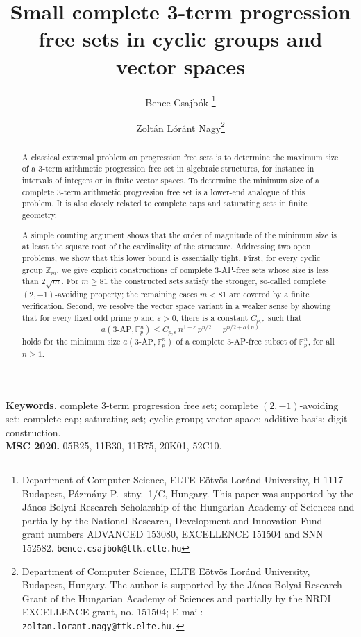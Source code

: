 \documentclass[11pt]{article}
\title{Small complete 3-term progression free sets in cyclic groups and vector spaces}
\author{Bence Csajb\'ok \thanks{Department of Computer Science, 
		ELTE E\"otv\"os Lor\'and University, 
		H-1117 Budapest, P\'azm\'any P.\ stny.\ 1/C, Hungary. This paper was supported by the János Bolyai Research Scholarship of the Hungarian Academy of Sciences and partially by the National Research, Development and Innovation Fund – grant numbers ADVANCED 153080, EXCELLENCE 151504 and SNN 152582. {\texttt{bence.csajbok@ttk.elte.hu}}} \and Zolt\'an Lóránt Nagy\thanks{ Department of Computer Science, 
		ELTE  E\"otv\"os Lor\'and University, Budapest, Hungary. The author is supported by  the J\'anos Bolyai Research Grant of the Hungarian Academy of Sciences and  partially by the NRDI EXCELLENCE grant, no.  151504;  	E-mail: {\tt zoltan.lorant.nagy@ttk.elte.hu.}}}
\date{}
\newcommand{\Z}{\mathbb Z}
\newcommand{\F}{\mathbb F}
\newcommand{\AP}{\mathrm{AP}}
\begin{document}
	\maketitle
	
	\begin{abstract}
		A classical extremal problem on progression free sets is to determine the maximum size of a $3$-term arithmetic progression free set in algebraic structures, for instance in intervals of integers  or in finite vector spaces.  To determine the minimum size of a complete $3$-term arithmetic progression free set is a lower-end analogue of this problem.  It is also closely related to complete caps and saturating sets in finite geometry.
		
		A simple counting argument shows that  the order of magnitude of the minimum size is at least the square root of the cardinality of the structure. Addressing two open problems, we show that this lower  bound is essentially tight.  First,  for every cyclic group $\Z_m$, we give explicit constructions of complete $3$-AP-free sets whose size is less than $2\sqrt m$.  For $m\ge81$ the constructed sets satisfy the stronger, so-called complete $(2,-1)$-avoiding property; the remaining cases $m<81$ are covered by a finite verification.  Second, we resolve the vector space variant in a weaker sense by showing that for every fixed odd prime $p$ and $\varepsilon>0$,  there is a constant $C_{p, \varepsilon}$ such that 
		\[
		a(3\text{-}\AP,\F_p^n)\le C_{p, \varepsilon}\,n^{1+\varepsilon}\,p^{n/2}
		=p^{n/2+o(n)}
		\] holds for the  minimum size  $a(3\text{-}\AP,\F_p^n)$ of a complete 3-AP-free subset of $\F_p^n$,  
		for all $n\ge1$.  %
		
	\end{abstract}
	
	\noindent\textbf{Keywords.} complete $3$-term progression free set; complete $(2,-1)$-avoiding set; complete cap; saturating set; cyclic group; vector space; additive basis; digit construction.\\
	\textbf{MSC 2020.} 05B25, 11B30, 11B75, 20K01, 52C10.
	
\end{document}
